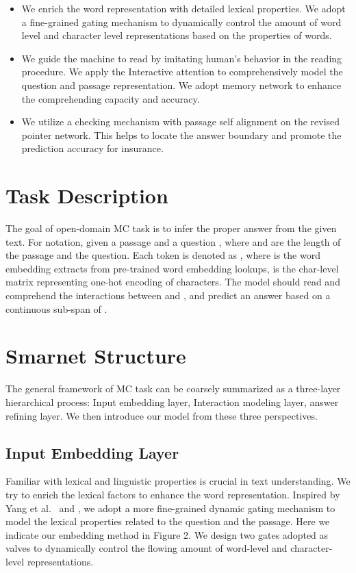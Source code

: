 \documentclass[letterpaper]{article} \usepackage{aaai18}  \usepackage{times}  \usepackage{helvet}  \usepackage{courier}  \usepackage{url}  \usepackage{graphicx}  \usepackage{booktabs}
\begin{document}
\begin{itemize}
	\item We enrich the word representation with detailed lexical properties. We adopt a fine-grained gating mechanism to dynamically control the amount of word level and character level representations based on the properties of words.
	\item We guide the machine to read by imitating human's behavior in the reading procedure. We apply the Interactive attention to comprehensively model the question and passage representation. We adopt memory network to enhance the comprehending capacity and accuracy. 
	\item We utilize a checking mechanism with passage self alignment on the revised pointer network. This helps to locate the answer boundary and promote the prediction accuracy for insurance. 
\end{itemize}
 
 \section{Task Description}
The goal of open-domain MC task is to infer the proper answer from the given text. For notation, given a passage  and a question , where  and  are the length of the passage and the question. Each token is denoted as , where  is the word embedding extracts from pre-trained word embedding lookups,  is the char-level matrix representing one-hot encoding of characters. The model should read and comprehend the interactions between  and , and predict an answer  based on a continuous sub-span of . 
 
 \section{ Smarnet Structure}
 The general framework of MC task can be coarsely summarized as a three-layer hierarchical process: Input embedding layer, Interaction modeling layer, answer refining layer. We then introduce our model from these three perspectives. 

 \subsection{Input Embedding Layer}
  Familiar with lexical and linguistic properties is crucial in text understanding. We try to enrich the lexical factors to enhance the word representation. Inspired by Yang et al.~\cite{Yang2016Words} \cite{Monsalve2012Lexical} \cite{Liu2017Structural} and \cite{chen2017reading}, we adopt a more fine-grained dynamic gating mechanism to model the lexical properties related to the question and the passage. Here we indicate our embedding method in Figure 2. We design two gates adopted as valves to dynamically control the flowing amount of word-level and character-level representations. 
  
\end{document}
